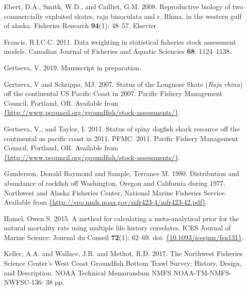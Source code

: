 \documentclass[12pt,]{article}
\begin{document}
\leavevmode\hypertarget{ref-Ebert2008}{}%
Ebert, D.A., Smith, W.D., and Cailliet, G.M. 2008. Reproductive biology
of two commercially exploited skates, raja binoculata and r. Rhina, in
the western gulf of alaska. Fisheries Research \textbf{94}(1): 48--57.
Elsevier.

\leavevmode\hypertarget{ref-Francis2011}{}%
Francis, R.I.C.C. 2011. Data weighting in statistical fisheries stock
assessment models. Canadian Journal of Fisheries and Aquatic Sciencies
\textbf{68}: 1124--1138.

\leavevmode\hypertarget{ref-Gertseva2019}{}%
Gertseva, V. 2019. Manuscript in preparation.

\leavevmode\hypertarget{ref-Gertseva2007}{}%
Gertseva, V and Schrippa, MJ. 2007. Status of the Longnose Skate
(\emph{Raja rhina}) off the continental US Pacific Coast in 2007.
Pacific Fishery Management Council, Portland, OR. Available from
\href{\%7Bhttp://www.pcouncil.org/groundfish/stock-assessments/\%7D}{\{http://www.pcouncil.org/groundfish/stock-assessments/\}}.

\leavevmode\hypertarget{ref-Gertseva2011}{}%
Gertseva, V., and Taylor, I. 2011. Status of spiny dogfish shark
resource off the continental us pacific coast in 2011. PFMC. 2011.
Pacific Fishery Management Council, Portland, OR. Available from
\href{\%7Bhttp://www.pcouncil.org/groundfish/stock-assessments/\%7D}{\{http://www.pcouncil.org/groundfish/stock-assessments/\}}.

\leavevmode\hypertarget{ref-Gunderson1980}{}%
Gunderson, Donald Raymond and Sample, Terrance M. 1980. Distribution and
abundance of rockfish off Washington, Oregon and California during 1977.
Northwest and Alaska Fisheries Center, National Marine Fisheries
Service. Available from
\href{\%7Bhttp://spo.nmfs.noaa.gov/mfr423-4/mfr423-42.pdf\%7D}{\{http://spo.nmfs.noaa.gov/mfr423-4/mfr423-42.pdf\}}.

\leavevmode\hypertarget{ref-Hamel2015}{}%
Hamel, Owen S. 2015. A method for calculating a meta-analytical prior
for the natural mortality rate using multiple life history correlates.
ICES Journal of Marine Science: Journal du Conseil \textbf{72}(1):
62--69. doi:
\href{https://doi.org/\%7B10.1093/icesjms/fsu131\%7D}{\{10.1093/icesjms/fsu131\}}.

\leavevmode\hypertarget{ref-Keller2017}{}%
Keller, A.A. and Wallace, J.R. and Methot, R.D. 2017. The Northwest
Fisheries Science Center's West Coast Groundfish Bottom Trawl Survey:
History, Design, and Description. NOAA Technical Memorandum NMFS
NOAA-TM-NMFS-NWFSC-136: 38 pp.
\end{document}
